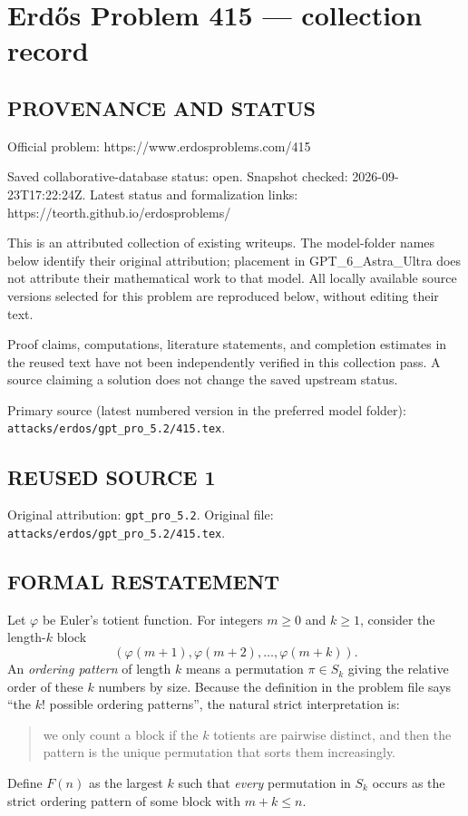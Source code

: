 \section*{Erd\H{o}s Problem 415 --- collection record}

\subsection*{PROVENANCE AND STATUS}
Official problem: https://www.erdosproblems.com/415

Saved collaborative-database status: open.
Snapshot checked: 2026-09-23T17:22:24Z.
Latest status and formalization links: https://teorth.github.io/erdosproblems/

This is an attributed collection of existing writeups. The model-folder names below identify their original attribution; placement in GPT\_6\_Astra\_Ultra does not attribute their mathematical work to that model. All locally available source versions selected for this problem are reproduced below, without editing their text.

Proof claims, computations, literature statements, and completion estimates in the reused text have not been independently verified in this collection pass. A source claiming a solution does not change the saved upstream status.

Primary source (latest numbered version in the preferred model folder): \texttt{attacks/erdos/gpt\_pro\_5.2/415.tex}.

\subsection*{REUSED SOURCE 1}
Original attribution: \texttt{gpt\_pro\_5.2}.
Original file: \texttt{attacks/erdos/gpt\_pro\_5.2/415.tex}.


\subsection*{FORMAL RESTATEMENT}
Let $\varphi$ be Euler's totient function.
For integers $m\ge0$ and $k\ge1$, consider the length-$k$ block
$$(\varphi(m+1),\varphi(m+2),\dots,\varphi(m+k)).$$
An \emph{ordering pattern} of length $k$ means a permutation $\pi\in S_k$ giving the relative order of these $k$ numbers by size.
Because the definition in the problem file says ``the $k!$ possible ordering patterns'', the natural strict interpretation is:
\begin{quote}
we only count a block if the $k$ totients are pairwise distinct, and then the pattern is the unique permutation that sorts them increasingly.
\end{quote}
Define $F(n)$ as the largest $k$ such that \emph{every} permutation in $S_k$ occurs as the strict ordering pattern of some block with $m+k\le n$.

